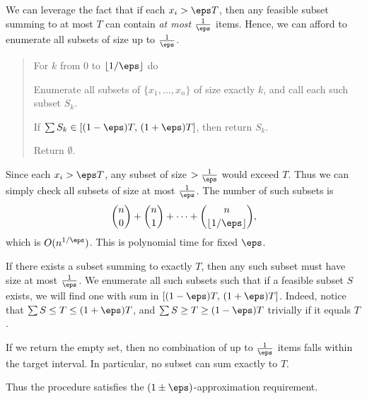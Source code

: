 \documentclass{article}
\begin{document}
\begin{solution}
  We can leverage the fact that if each \( x_i > \eps T \), then any feasible subset summing to at most \( T \) can contain \emph{at most} \( \tfrac{1}{\eps} \) items.
  Hence, we can afford to enumerate all subsets of size up to \( \frac{1}{\eps} \).

  \begin{quote}


  \begin{steps}
    \item For \( k \) from 0 to \( \lfloor 1/\eps \rfloor \) do
    \begin{steps}
      \item Enumerate all subsets of \( \{x_1,\dots,x_n\} \) of size exactly \( k \), and call each such subset \( S_k \).
      \item If \( \sum S_k \in [(1-\eps)T,\,(1+\eps)T] \), then return \( S_k \).
    \end{steps}
    \item Return \( \emptyset \).
  \end{steps}
  \end{quote}

  \begin{subproof}[Runtime]
  Since each \( x_i > \eps T \), any subset of size \( >\frac{1}{\eps} \) would exceed \( T \).
  Thus we can simply check all subsets of size at most \( \frac{1}{\eps} \).
  The number of such subsets is
  \[
  \binom{n}{0} + \binom{n}{1} + \cdots + \binom{n}{\lfloor 1/\eps \rfloor},
  \]
  which is \( O(n^{1/\eps}) \).
  This is polynomial time for fixed \( \eps \).
  \end{subproof}

  \begin{subproof}[Correctness]
    If there exists a subset summing to exactly \( T \), then any such subset must have size at most \( \frac{1}{\eps} \).
    We enumerate all such subsets such that if a feasible subset \( S \) exists, we will find one with sum in \( [(1-\eps)T,\,(1+\eps)T] \).
    Indeed, notice that \( \sum S \leq T \leq (1+\eps)T \), and \( \sum S \geq T \geq (1-\eps)T \) trivially if it equals \( T \).

    If we return the empty set, then no combination of up to \( \frac{1}{\eps} \) items falls within the target interval.
    In particular, no subset can sum exactly to \( T \).

    Thus the procedure satisfies the \( (1 \pm \eps) \)-approximation requirement.
  \end{subproof}
\end{solution}
\pagebreak
\end{document}
